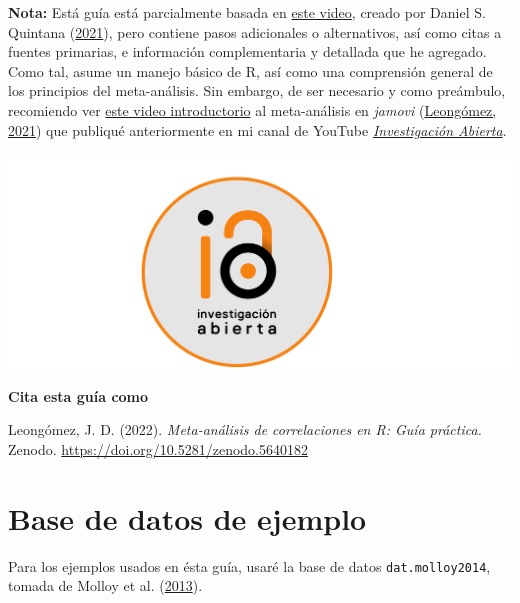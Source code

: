 \documentclass[
  bookmarksnumbered]{article}
\begin{document}
\textbf{Nota:} Está guía está parcialmente basada en \href{https://youtu.be/lH4VZMTEZSc}{este video}, creado por Daniel S. Quintana (\protect\hyperlink{ref-quintanaHowPerformMetaanalysis2021}{2021}), pero contiene pasos adicionales o alternativos, así como citas a fuentes primarias, e información complementaria y detallada que he agregado. Como tal, asume un manejo básico de R, así como una comprensión general de los principios del meta-análisis. Sin embargo, de ser necesario y como preámbulo, recomiendo ver \href{https://youtu.be/ntBbkOn9D_o}{este video introductorio} al meta-análisis en \emph{jamovi} (\protect\hyperlink{ref-leongomezMetaanalysis2021}{Leongómez, 2021}) que publiqué anteriormente en mi canal de YouTube \href{https://www.youtube.com/c/InvestigaciónAbierta}{\emph{Investigación Abierta}}.

\href{https://www.youtube.com/c/InvestigaciónAbierta}{\includegraphics{images/Logo-IA-Rectangulo.pdf}}

\par
\endgroup
\vfill

\textbf{Cita esta guía como } \hrulefill 

\begin{hangparas}{.25in}{1}
Leongómez, J. D. (2022). \textit{Meta-análisis de correlaciones en R: Guía práctica.} Zenodo. \url{https://doi.org/10.5281/zenodo.5640182}
\end{hangparas}
\newpage

{\hypersetup{hidelinks}
 \setcounter{tocdepth}{5}
 \tableofcontents
}
\newpage

\hypertarget{base-de-datos-de-ejemplo}{%
\section{Base de datos de ejemplo}\label{base-de-datos-de-ejemplo}}

Para los ejemplos usados en ésta guía, usaré la base de datos \texttt{dat.molloy2014}, tomada de Molloy et al. (\protect\hyperlink{ref-molloy2013}{2013}).
\end{document}
